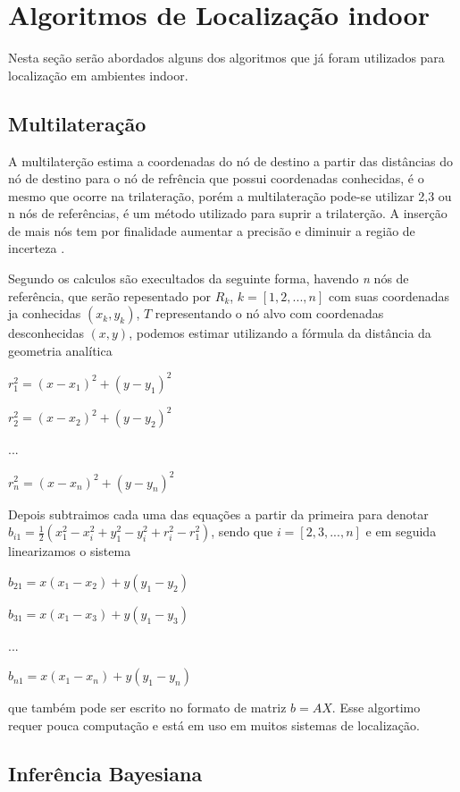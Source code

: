 \section{Algoritmos de Localização indoor}
Nesta seção serão abordados alguns dos algoritmos que já foram utilizados para localização em ambientes indoor.
    \subsection{Multilateração}
    A multilaterção estima a coordenadas do nó de destino a partir das distâncias do nó de destino para o nó de refrência que possui coordenadas conhecidas, é o mesmo que ocorre na trilateração, porém a multilateração pode-se utilizar 2,3 ou n nós de referências, é um método utilizado para suprir a trilaterção. A inserção de mais nós tem por finalidade aumentar a precisão e diminuir a região de incerteza \cite{rfid2009review}.
    \par
    Segundo \citeauthor{rfid2009review} os calculos são execultados da seguinte forma, havendo \textit{n} nós de referência, que serão repesentado por $R_k$,  $k = \left[ 1, 2, ... , n \right] $ com suas coordenadas ja conhecidas $( x_k, y_k )$, $T$ representando o nó alvo com coordenadas desconhecidas $(x,y)$, podemos estimar utilizando a fórmula da distância da geometria analítica
    \par $r_1^2 = (x - x_1 )^2 + (y - y_1)^2$
    \par $r_2^2 = (x - x_2 )^2 + (y - y_2)^2$
    \par ...
    \par $r_n^2 = (x - x_n )^2 + (y - y_n)^2$
    \par 
    Depois subtraimos cada uma das equações a partir da primeira para denotar $b_{i1}= \frac{1}{2}(x_1^2 - x_i^2 + y_1^2 -y_i^2 + r_i^2 - r_1^2)$, sendo que $i = [2,3, ..., n]$ e em seguida linearizamos o sistema
    \par $b_{21} = x(x_1 - x_2) + y(y_1 - y_2)$
    \par $b_{31} = x(x_1 - x_3) + y(y_1 - y_3)$
    \par ...
    \par $b_{n1} = x(x_1 - x_n) + y(y_1 - y_n)$
    \par que também pode ser escrito no formato de matriz $b = AX$. Esse algortimo requer pouca computação e está em uso em muitos sistemas de localização.    

    \subsection{Inferência Bayesiana}
